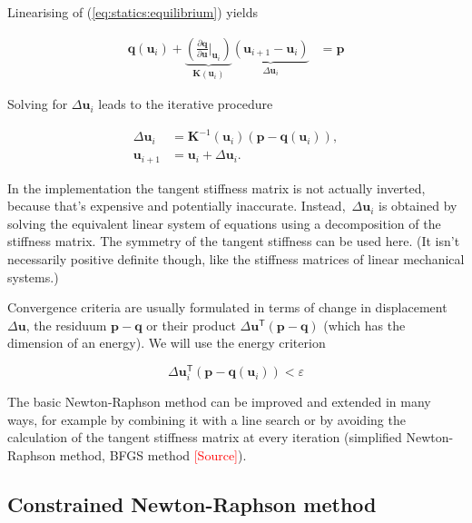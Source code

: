 Linearising of (\ref{eq:statics:equilibrium}) yields

\begin{align}
\boldsymbol{q}(\boldsymbol{u}_i) +
\underbrace{
\left(\frac{\partial \boldsymbol{q}}{\partial \boldsymbol{u}}\bigg \vert_{\boldsymbol{u}_i}\right)
}_{\boldsymbol{K}(\boldsymbol{u}_i)}
\underbrace{
(\boldsymbol{u}_{i+1} - \boldsymbol{u}_i)
}_{\Delta\boldsymbol{u}_i} &= \boldsymbol{p}
\end{align}

Solving for $\Delta\boldsymbol{u}_i$ leads to the iterative procedure

\begin{align}
\Delta\boldsymbol{u}_i &= \boldsymbol{K}^{-1}(\boldsymbol{u}_i)\left(\boldsymbol{p} - \boldsymbol{q}(\boldsymbol{u}_i)\right),\\
\boldsymbol{u}_{i+1} &= \boldsymbol{u}_i + \Delta\boldsymbol{u}_i.\label{eq:statics:newton_iteration}
\end{align}

In the implementation the tangent stiffness matrix is not actually inverted, because that's expensive and potentially inaccurate. Instead,~$\Delta\boldsymbol{u}_i$ is obtained by solving the equivalent linear system of equations using a decomposition of the stiffness matrix. The symmetry of the tangent stiffness can be used here. (It isn't necessarily positive definite though, like the stiffness matrices of linear mechanical systems.)

Convergence criteria are usually formulated in terms of change in displacement~$\Delta\boldsymbol{u}$, the residuum $\boldsymbol{p} - \boldsymbol{q}$ or their product $\Delta\boldsymbol{u}^\mathsf{T}(\boldsymbol{p}-\boldsymbol{q})$ (which has the dimension of an energy). We will use the energy criterion

\begin{equation*}
\Delta\boldsymbol{u}_{i}^\mathsf{T}(\boldsymbol{p}-\boldsymbol{q}(\boldsymbol{u}_i)) < \varepsilon
\end{equation*}

The basic Newton-Raphson method can be improved and extended in many ways, for example by combining it with a line search or by avoiding the calculation of the tangent stiffness matrix at every iteration (simplified Newton-Raphson method, BFGS method \textcolor{red}{[Source]}).

\subsection{Constrained Newton-Raphson method}

